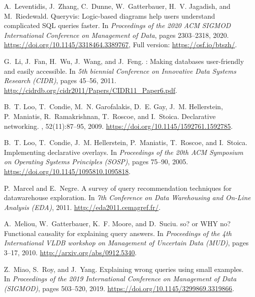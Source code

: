 \documentclass[letterpaper,11pt]{article}
\begin{document}
\begin{thebibliography}{100}
A.~Leventidis, J.~Zhang, C.~Dunne, W.~Gatterbauer, H.~V. Jagadish, and
  M.~Riedewald.
\newblock Queryvis: Logic-based diagrams help users understand complicated
  {SQL} queries faster.
\newblock In {\em Proceedings of the 2020 ACM SIGMOD International Conference
  on Management of Data}, pages 2303--2318, 2020.
\newblock \url{https://doi.org/10.1145/3318464.3389767}, Full version:
  \url{https://osf.io/btszh/}.

G.~Li, J.~Fan, H.~Wu, J.~Wang, and J.~Feng.
: Making databases user-friendly and easily accessible.
\newblock In {\em 5th biennial Conference on Innovative Data Systems Research
  (CIDR)}, pages 45--56, 2011.
\newblock \url{http://cidrdb.org/cidr2011/Papers/CIDR11\_Paper6.pdf}.

B.~T. Loo, T.~Condie, M.~N. Garofalakis, D.~E. Gay, J.~M. Hellerstein,
  P.~Maniatis, R.~Ramakrishnan, T.~Roscoe, and I.~Stoica.
\newblock Declarative networking.
, 52(11):87--95, 2009.
\newblock \url{https://doi.org/10.1145/1592761.1592785}.

B.~T. Loo, T.~Condie, J.~M. Hellerstein, P.~Maniatis, T.~Roscoe, and I.~Stoica.
\newblock Implementing declarative overlays.
\newblock In {\em Proceedings of the 20th {ACM} Symposium on Operating Systems
  Principles ({SOSP})}, pages 75--90, 2005.
\newblock \url{https://doi.org/10.1145/1095810.1095818}.

P.~Marcel and E.~Negre.
\newblock A survey of query recommendation techniques for datawarehouse
  exploration.
\newblock In {\em 7th Conference on Data Warehousing and On-Line Analysis
  (EDA)}, 2011.
\newblock \url{http://eda2011.cemagref.fr/}.

A.~Meliou, W.~Gatterbauer, K.~F. Moore, and D.~Suciu.
 so? or {WHY} no? {F}unctional causality for explaining query
  answers.
\newblock In {\em Proceedings of the 4th International {VLDB} workshop on
  Management of Uncertain Data {(MUD})}, pages 3--17, 2010.
\newblock \url{http://arxiv.org/abs/0912.5340}.

Z.~Miao, S.~Roy, and J.~Yang.
\newblock Explaining wrong queries using small examples.
\newblock In {\em Proceedings of the 2019 International Conference on
  Management of Data ({SIGMOD})}, pages 503--520, 2019.
\newblock \url{https://doi.org/10.1145/3299869.3319866}.


\end{thebibliography}
\end{document}
